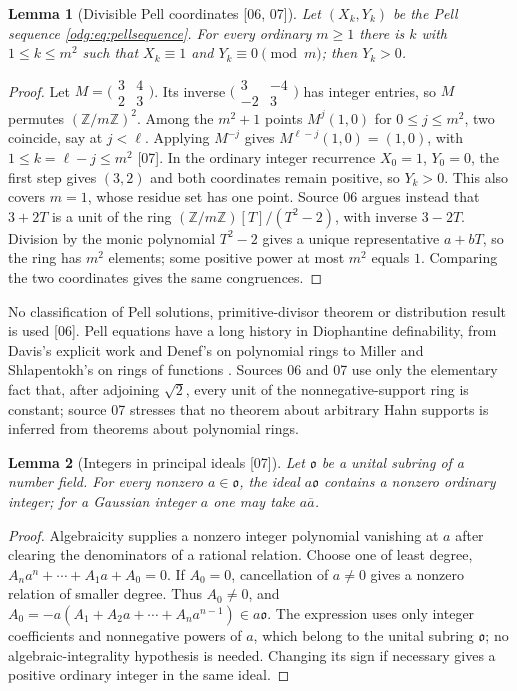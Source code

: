 \documentclass[11pt,oneside]{article}
\numberwithin{equation}{section}
\newtheorem{lemma}[lemma]{Lemma}
\theoremstyle{definition}
\theoremstyle{remark}
\newcommand{\Z}{\mathbb Z}
\newcommand{\src}[1]{\textup{\textsf{\small[#1]}}}
\begin{document}
\begin{lemma}[Divisible Pell coordinates \src{06, 07}]\label{odg:def:lem:pelldiv}
Let $(X_k,Y_k)$ be the Pell sequence \eqref{odg:eq:pellsequence}. For every
ordinary $m\ge1$ there is $k$ with $1\le k\le m^2$ such that
$X_k\equiv1$ and $Y_k\equiv0\pmod m$; then $Y_k>0$.
\end{lemma}
\begin{proof}
Let $M=\bigl(\begin{smallmatrix}3&4\\2&3\end{smallmatrix}\bigr)$.
Its inverse $\bigl(\begin{smallmatrix}3&-4\\-2&3\end{smallmatrix}\bigr)$ has
integer entries, so $M$ permutes $(\Z/m\Z)^2$. Among the $m^2+1$ points
$M^j(1,0)$ for $0\le j\le m^2$, two coincide, say at $j<\ell$. Applying
$M^{-j}$ gives $M^{\ell-j}(1,0)=(1,0)$, with
$1\le k=\ell-j\le m^2$ \src{07}. In the ordinary integer recurrence
$X_0=1$, $Y_0=0$, the first step gives $(3,2)$ and both coordinates remain
positive, so $Y_k>0$. This also covers $m=1$, whose residue set has one
point. Source 06 argues instead that $3+2T$ is a unit
of the ring $(\Z/m\Z)[T]/(T^2-2)$, with inverse $3-2T$. Division by the
monic polynomial $T^2-2$ gives a unique representative $a+bT$, so the ring
has $m^2$ elements; some positive power at most $m^2$ equals $1$.
Comparing the two coordinates gives the same congruences.
\end{proof}

No classification of Pell solutions, primitive-divisor theorem or
distribution result is used \src{06}. Pell equations have a long history in
Diophantine definability, from Davis's explicit work \cite{Davis} and Denef's
on polynomial rings \cite{Denef} to Miller and Shlapentokh's on rings of
functions \cite{MillerShlapentokh}. Sources 06 and 07 use only the elementary
fact that, after adjoining $\sqrt2$, every unit of the nonnegative-support
ring is constant; source 07 stresses that no theorem about arbitrary Hahn
supports is inferred from theorems about polynomial rings.

\begin{lemma}[Integers in principal ideals \src{07}]\label{odg:def:lem:intmultiple}
Let $\mathfrak o$ be a unital subring of a number field. For every nonzero
$a\in\mathfrak o$, the ideal $a\mathfrak o$ contains a nonzero ordinary
integer; for a Gaussian integer $a$ one may take $a\overline a$.
\end{lemma}
\begin{proof}
Algebraicity supplies a nonzero integer polynomial vanishing at $a$ after
clearing the denominators of a rational relation. Choose one of least
degree, $A_na^n+\cdots+A_1a+A_0=0$. If $A_0=0$, cancellation of $a\ne0$
gives a nonzero relation of smaller degree. Thus $A_0\ne0$, and
$A_0=-a(A_1+A_2a+\cdots+A_na^{n-1})\in a\mathfrak o$.
The expression uses only integer coefficients and nonnegative powers of
$a$, which belong to the unital subring $\mathfrak o$; no algebraic-integrality
hypothesis is needed. Changing its sign if necessary gives a positive
ordinary integer in the same ideal.
\end{proof}
\end{document}
